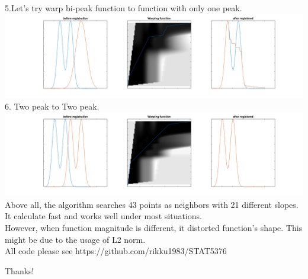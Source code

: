 \documentclass[11pt]{scrartcl}
\begin{document}
5.Let's try warp bi-peak function to function with only one peak.\\
\includegraphics[scale=0.4]{hw45.png}\\
6. Two peak to Two peak.\\
\includegraphics[scale=0.4]{hw46.png}\\

Above all, the algorithm searches 43 points as neighbors with 21 different slopes. It calculate fast and works well under most situations.\\
However, when function magnitude is different, it distorted function's shape. This might be due to the usage of L2 norm.\\

All code please see https://github.com/rikku1983/STAT5376\\
\bigskip

Thanks!
\end{document}
